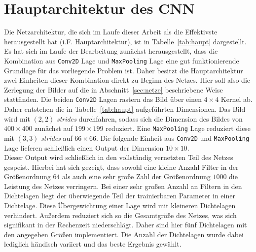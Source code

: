 \section{Hauptarchitektur des CNN}
%
Die Netzarchitektur, die sich im Laufe dieser Arbeit als die Effektivste
herausgestellt hat (i.F. Hauptarchitektur), ist in Tabelle~\ref{tab:haupt} dargestellt. Es hat
sich im Laufe der Bearbeitung zunächst herausgestellt, dass die Kombination
aus \texttt{Conv2D} Lage und \texttt{MaxPooling} Lage eine gut
funktionierende Grundlage für das vorliegende Problem ist.
Daher besitzt die Hauptarchitektur zwei Einheiten dieser Kombination
direkt zu Beginn des Netzes. Hier soll also die Zerlegung der Bilder auf
die in Abschnitt~\ref{sec:netze} beschriebene Weise stattfinden.
Die beiden \texttt{Conv2D} Lagen rastern das Bild über einen $4\times4$
Kernel ab. Daher entstehen die in Tabelle~\ref{tab:haupt} aufgeführten
Dimensionen. Das Bild wird mit $(2, 2)$ \textit{strides} durchfahren,
sodass sich die Dimension des Bildes von $400\times400$ zunächst auf
$199\times199$ reduziert. Eine \texttt{MaxPooling} Lage reduziert diese
mit $(3, 3)$ \textit{strides} auf $66\times66$. Die folgende Einheit
aus  \texttt{Conv2D} und \texttt{MaxPooling} Lage lieferen schließlich
einen Output der Dimension $10\times10$.\\
Dieser Output wird schließlich in den vollständig vernetzten Teil des
Netzes gespeist. Hierbei hat sich gezeigt, dass sowohl eine kleine Anzahl
Filter in der Größenordnung $64$ als auch eine sehr große Zahl der
Größenordnung $1000$ die Leistung des Netzes verringern. Bei einer sehr großen
Anzahl an Filtern in den Dichtelagen liegt der überwiegende Teil der
trainierbaren Parameter in einer Dichtelage. Diese Übergewichtung einer Lage
wird mit kleineren Dichtelagen verhindert. Außerdem reduziert sich so die
Gesamtgröße des Netzes, was sich signifikant in der Rechenzeit niederschlägt.
Daher sind hier fünf Dichtelagen mit den angegeben Größen implementiert.
Die Anzahl der Dichtelagen wurde dabei lediglich händisch variiert und das
beste Ergebnis gewählt.
%

